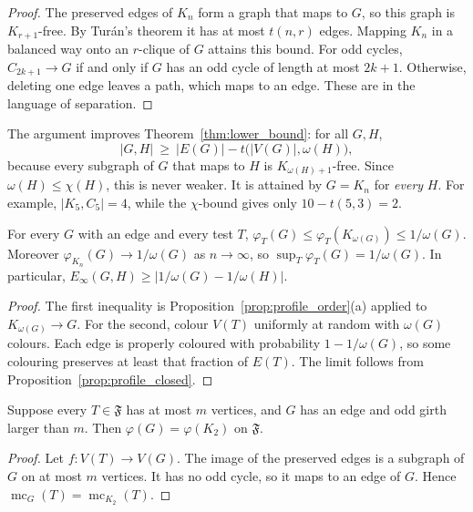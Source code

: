 \begin{proof}
The preserved edges of $K_n$ form a graph that maps to $G$, so this graph
is $K_{r+1}$-free.  By Tur\'an's theorem it has at most $t(n,r)$ edges.
Mapping $K_n$ in a balanced way onto an $r$-clique of $G$ attains this
bound.  For odd cycles, $C_{2k+1}\to G$ if and only if $G$ has an odd cycle
of length at most $2k+1$.  Otherwise, deleting one edge leaves a path,
which maps to an edge.
These are \cite[Props.~2.4, 2.5]{efjt2015} in the language of
separation.
\end{proof}

\begin{remark}
The argument improves Theorem~\ref{thm:lower_bound}: for all $G,H$,
\[
|G,H|\ \ge\ |E(G)|-t\bigl(|V(G)|,\omega(H)\bigr),
\]
because every subgraph of $G$ that maps to $H$ is
$K_{\omega(H)+1}$-free.  Since $\omega(H)\le\chi(H)$, this is never weaker.
It is attained by $G=K_n$ for \emph{every} $H$.
For example, $|K_5,C_5|=4$, while the $\chi$-bound gives only $10-t(5,3)=2$.
\end{remark}

\begin{proposition}
\label{prop:profile_range}
For every $G$ with an edge and every test $T$,
$\varphi_T(G)\le\varphi_T(K_{\omega(G)})\le 1/\omega(G)$.
Moreover $\varphi_{K_n}(G)\to1/\omega(G)$ as $n\to\infty$, so
$\sup_T\varphi_T(G)=1/\omega(G)$.  In particular,
$E_\infty(G,H)\ge\bigl|1/\omega(G)-1/\omega(H)\bigr|$.
\end{proposition}

\begin{proof}
The first inequality is Proposition~\ref{prop:profile_order}(a) applied to
$K_{\omega(G)}\to G$.  For the second, colour $V(T)$ uniformly at random
with $\omega(G)$ colours.  Each edge is properly coloured with probability
$1-1/\omega(G)$, so some colouring preserves at least that fraction of
$E(T)$.  The limit follows from Proposition~\ref{prop:profile_closed}.
\end{proof}

\begin{proposition}
\label{prop:profile_blind}
Suppose every $T\in\mathfrak F$ has at most $m$ vertices, and $G$ has an
edge and odd girth larger than $m$.  Then $\varphi(G)=\varphi(K_2)$ on
$\mathfrak F$.
\end{proposition}

\begin{proof}
Let $f\colon V(T)\to V(G)$.  The image of the preserved edges is a subgraph
of $G$ on at most $m$ vertices.  It has no odd cycle, so it maps to an edge
of $G$.  Hence $\operatorname{mc}_G(T)=\operatorname{mc}_{K_2}(T)$.
\end{proof}

